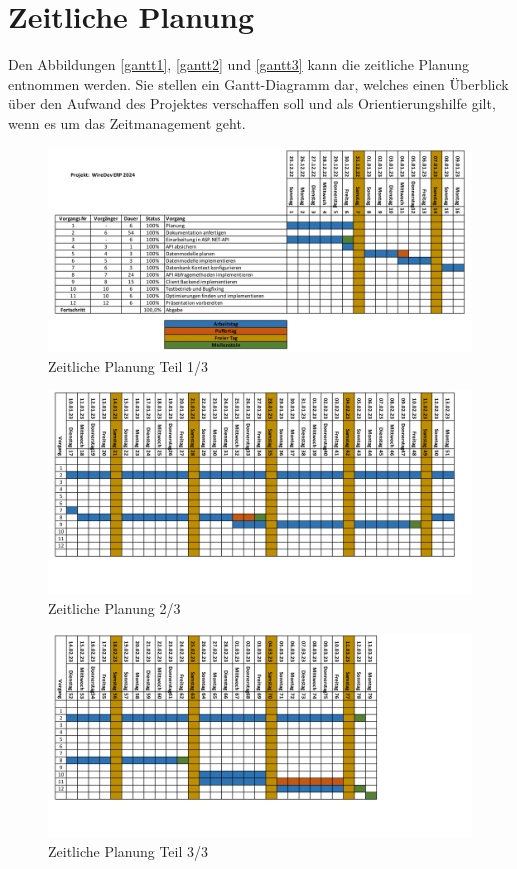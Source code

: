 \section{Zeitliche Planung}
Den Abbildungen \vref{gantt1}, \vref{gantt2} und \vref{gantt3} kann die zeitliche Planung entnommen werden. Sie stellen ein Gantt-Diagramm dar, welches einen Überblick über den Aufwand des Projektes verschaffen soll und als Orientierungshilfe gilt, wenn es um das Zeitmanagement geht.

\begin{figure}
	\centering
	\includegraphics[width=1\linewidth]{Gantt-1.png}
	\caption{Zeitliche Planung Teil 1/3}
	\label{gantt1}
\end{figure}

\begin{figure}
\centering
\includegraphics[width=1\linewidth]{Gantt-2.png}
\caption{Zeitliche Planung 2/3}
\label{gantt2}
\end{figure}

\begin{figure}
\centering
\includegraphics[width=1\linewidth]{Gantt-3.png}
\caption{Zeitliche Planung Teil 3/3}
\label{gantt3}
\end{figure}